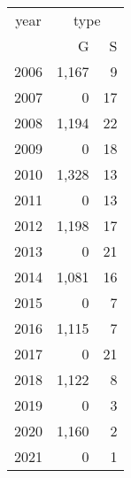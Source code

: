 \footnotesize\begin{tabular}[t]{lrr}
\toprule
\multicolumn{1}{c}{year} & \multicolumn{2}{c}{type} \\
\cmidrule(l{3pt}r{3pt}){1-1} \cmidrule(l{3pt}r{3pt}){2-3}
  & G & S\\
\midrule
2006 & 1,167 & 9\\
2007 & 0 & 17\\
2008 & 1,194 & 22\\
2009 & 0 & 18\\
2010 & 1,328 & 13\\
2011 & 0 & 13\\
2012 & 1,198 & 17\\
2013 & 0 & 21\\
2014 & 1,081 & 16\\
2015 & 0 & 7\\
2016 & 1,115 & 7\\
2017 & 0 & 21\\
2018 & 1,122 & 8\\
2019 & 0 & 3\\
2020 & 1,160 & 2\\
2021 & 0 & 1\\
\bottomrule
\end{tabular}
